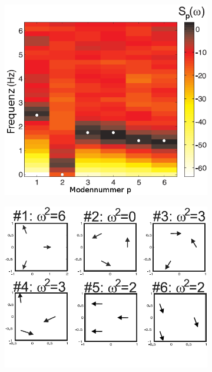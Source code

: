           \begin{figure}
            \centering
            \begin{subfigure}[b]{0.48\textwidth}
              \centering
              \includegraphics[width=\textwidth,height=0.3\textheight]{figs/modenvenergie3teilchenmelzer.png}
              \caption{}
              \label{img:spektrum}
            \end{subfigure}
            \begin{subfigure}[b]{0.48\textwidth}
              \centering
              \includegraphics[width=\textwidth,height=0.3\textheight]{figs/modenvektoren3teilchenmelzer.png}

\end{subfigure}
\end{figure}
